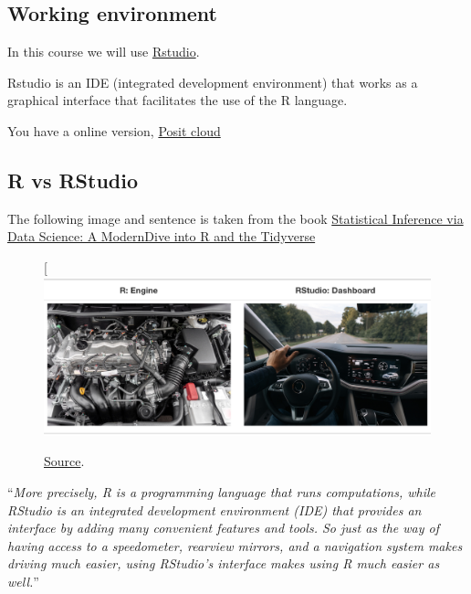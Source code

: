\documentclass[
  letterpaper,
  DIV=11,
  numbers=noendperiod]{scrartcl}
\begin{document}
\hypertarget{working-environment}{%
\subsection{Working environment}\label{working-environment}}

In this course we will use
\href{https://posit.co/download/rstudio-desktop/}{Rstudio}.

Rstudio is an IDE (integrated development environment) that works as a
graphical interface that facilitates the use of the R language.

You have a online version,
\href{https://login.rstudio.cloud/login?redirect=\%2F}{Posit cloud}

\hypertarget{r-vs-rstudio}{%
\subsection{R vs RStudio}\label{r-vs-rstudio}}

The following image and sentence is taken from the book
\href{https://moderndive.com/index.html}{Statistical Inference via Data
Science: A ModernDive into R and the Tidyverse}

\begin{figure}

{\centering 

{[}\includegraphics{IOwithR_files/mediabag/R_vs_RStudio_1.png}

}

\caption{\label{fig-rvsrstudio}\href{https://moderndive.com/1-getting-started.html}{Source}.}

\end{figure}

``\emph{More precisely, R is a programming language that runs
computations, while RStudio is an integrated development environment
(IDE) that provides an interface by adding many convenient features and
tools. So just as the way of having access to a speedometer, rearview
mirrors, and a navigation system makes driving much easier, using
RStudio's interface makes using R much easier as well.}''
\end{document}
